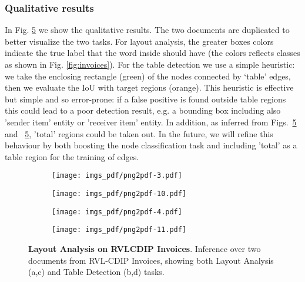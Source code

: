 \documentclass[runningheads]{llncs}
\begin{document}
\subsubsection{Qualitative results}
In Fig. \ref{fig:invoices-pred} we show the qualitative results. The two documents are duplicated to better visualize the two tasks. For layout analysis, the greater boxes colors indicate the true label that the word inside should have (the colors reflects classes as shown in Fig. \ref{fig:invoices}). For the table detection we use a simple heuristic: we take the enclosing rectangle (green) of the nodes connected by `table' edges, then we evaluate the IoU with target regions (orange). This heuristic is effective but simple and so error-prone: if a false positive is found outside table regions this could lead to a poor detection result, e.g. a bounding box including also 'sender item'  entity or 'receiver item' entity. In addition, as inferred from Figs.~\ref{fig:invoices-pred} and ~\ref{fig:invoices-pred}, 'total' regions could be taken out.
In the future, we will refine this behaviour by both boosting the node classification task and including 'total' as a table region for the training of edges.

\begin{figure}[t!]
     \centering
     \begin{subfigure}[b]{0.45\textwidth}
         \centering
         \texttt{[image: imgs\_pdf/png2pdf-3.pdf]}
         \caption{}
         \label{fig:rvl-a}
    \end{subfigure}
     \begin{subfigure}[b]{0.45\textwidth}
         \centering
         \texttt{[image: imgs\_pdf/png2pdf-10.pdf]}
         \caption{}
         \label{fig:rvl-b}
    \end{subfigure}
     \hfill
     \begin{subfigure}[b]{0.45\textwidth}
         \centering
         \texttt{[image: imgs\_pdf/png2pdf-4.pdf]}
         \caption{}
         \label{fig:rvl-c}
     \end{subfigure}
     \begin{subfigure}[b]{0.45\textwidth}
         \centering
         \texttt{[image: imgs\_pdf/png2pdf-11.pdf]}
         \caption{}
         \label{fig:rvl-d}
     \end{subfigure}
        \caption{\textbf{Layout Analysis on RVLCDIP Invoices}. Inference over two documents from RVL-CDIP Invoices, showing both Layout Analysis (a,c) and Table Detection (b,d) tasks.}
        \label{fig:invoices-pred}
\end{figure} 
\end{document}
